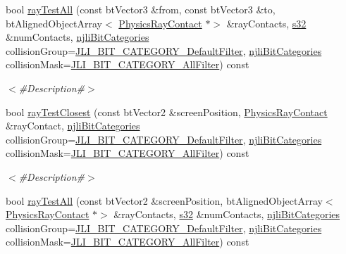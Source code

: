 \begin{DoxyCompactItemize}
bool \mbox{\hyperlink{classnjli_1_1_node_af9fb9a65a5f91bb4528bc71d5afb5beb}{ray\+Test\+All}} (const bt\+Vector3 \&from, const bt\+Vector3 \&to, bt\+Aligned\+Object\+Array$<$ \mbox{\hyperlink{classnjli_1_1_physics_ray_contact}{Physics\+Ray\+Contact}} $\ast$$>$ \&ray\+Contacts, \mbox{\hyperlink{_util_8h_aa62c75d314a0d1f37f79c4b73b2292e2}{s32}} \&num\+Contacts, \mbox{\hyperlink{namespacenjli_af7b302a2b48bb644f85c88080925c974}{njli\+Bit\+Categories}} collision\+Group=\mbox{\hyperlink{namespacenjli_af7b302a2b48bb644f85c88080925c974a53b33337014e199f56e752574f36981e}{J\+L\+I\+\_\+\+B\+I\+T\+\_\+\+C\+A\+T\+E\+G\+O\+R\+Y\+\_\+\+Default\+Filter}}, \mbox{\hyperlink{namespacenjli_af7b302a2b48bb644f85c88080925c974}{njli\+Bit\+Categories}} collision\+Mask=\mbox{\hyperlink{namespacenjli_af7b302a2b48bb644f85c88080925c974a0fba80cad161dda96de5cbda9091cdce}{J\+L\+I\+\_\+\+B\+I\+T\+\_\+\+C\+A\+T\+E\+G\+O\+R\+Y\+\_\+\+All\+Filter}}) const
\begin{DoxyCompactList}\small\item\em $<$\#\+Description\#$>$ \end{DoxyCompactList}\item 
bool \mbox{\hyperlink{classnjli_1_1_node_a08ae871c8da4c86989ca40a76b08e138}{ray\+Test\+Closest}} (const bt\+Vector2 \&screen\+Position, \mbox{\hyperlink{classnjli_1_1_physics_ray_contact}{Physics\+Ray\+Contact}} \&ray\+Contact, \mbox{\hyperlink{namespacenjli_af7b302a2b48bb644f85c88080925c974}{njli\+Bit\+Categories}} collision\+Group=\mbox{\hyperlink{namespacenjli_af7b302a2b48bb644f85c88080925c974a53b33337014e199f56e752574f36981e}{J\+L\+I\+\_\+\+B\+I\+T\+\_\+\+C\+A\+T\+E\+G\+O\+R\+Y\+\_\+\+Default\+Filter}}, \mbox{\hyperlink{namespacenjli_af7b302a2b48bb644f85c88080925c974}{njli\+Bit\+Categories}} collision\+Mask=\mbox{\hyperlink{namespacenjli_af7b302a2b48bb644f85c88080925c974a0fba80cad161dda96de5cbda9091cdce}{J\+L\+I\+\_\+\+B\+I\+T\+\_\+\+C\+A\+T\+E\+G\+O\+R\+Y\+\_\+\+All\+Filter}}) const
\begin{DoxyCompactList}\small\item\em $<$\#\+Description\#$>$ \end{DoxyCompactList}\item 
bool \mbox{\hyperlink{classnjli_1_1_node_a51b52e3df8267ce23555cd550b359ff1}{ray\+Test\+All}} (const bt\+Vector2 \&screen\+Position, bt\+Aligned\+Object\+Array$<$ \mbox{\hyperlink{classnjli_1_1_physics_ray_contact}{Physics\+Ray\+Contact}} $\ast$$>$ \&ray\+Contacts, \mbox{\hyperlink{_util_8h_aa62c75d314a0d1f37f79c4b73b2292e2}{s32}} \&num\+Contacts, \mbox{\hyperlink{namespacenjli_af7b302a2b48bb644f85c88080925c974}{njli\+Bit\+Categories}} collision\+Group=\mbox{\hyperlink{namespacenjli_af7b302a2b48bb644f85c88080925c974a53b33337014e199f56e752574f36981e}{J\+L\+I\+\_\+\+B\+I\+T\+\_\+\+C\+A\+T\+E\+G\+O\+R\+Y\+\_\+\+Default\+Filter}}, \mbox{\hyperlink{namespacenjli_af7b302a2b48bb644f85c88080925c974}{njli\+Bit\+Categories}} collision\+Mask=\mbox{\hyperlink{namespacenjli_af7b302a2b48bb644f85c88080925c974a0fba80cad161dda96de5cbda9091cdce}{J\+L\+I\+\_\+\+B\+I\+T\+\_\+\+C\+A\+T\+E\+G\+O\+R\+Y\+\_\+\+All\+Filter}}) const

\end{DoxyCompactItemize}
